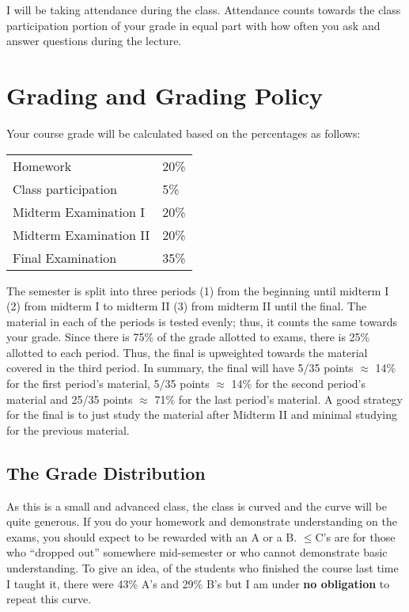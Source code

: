 \documentclass[12pt]{article}
\newcommand{\inred}[1]{\color{red}\textbf{#1} \color{black}}
\newcommand{\qu}[1]{``#1''}
\begin{document}
I will be taking attendance during the class. Attendance counts towards the class participation portion of your grade in equal part with how often you ask and answer questions during the lecture.


\section*{Grading and Grading Policy}\label{sec:grading}

Your course grade will be calculated based on the percentages as follows: 

\begin{table}[h]
\centering
\begin{tabular}{l|l}
Homework & 20\% \\
Class participation & 5\% \\
Midterm Examination I & 20\%\\
Midterm Examination II & 20\%\\
Final Examination & 35\%
\end{tabular}
\end{table}
\FloatBarrier

The semester is split into three periods (1) from the beginning until midterm I (2) from midterm I to midterm II (3) from midterm II until the final. The material in each of the periods is tested evenly; thus, it counts the same towards your grade. Since there is 75\% of the grade allotted to exams, there is 25\% allotted to each period. Thus, the final is upweighted towards the material covered in the third period. In summary, the final will have 5/35 points $\approx$ 14\% for the first period's material, 5/35 points $\approx$ 14\% for the second period's material and 25/35 points $\approx$ 71\% for the last period's material. A good strategy for the final is to just study the material after Midterm II and minimal studying for the previous material.

\subsection*{The Grade Distribution}

As this is a small and advanced class, the class is curved and the curve will be quite generous. If you do your homework and demonstrate understanding on the exams, you should expect to be rewarded with an A or a B. $\leq$C's are for those who \qu{dropped out} somewhere mid-semester or who cannot demonstrate basic understanding. To give an idea, of the students who finished the course last time I taught it, there were 43\% A's and 29\% B's but I am under \inred{no obligation} to repeat this curve.
\end{document}
